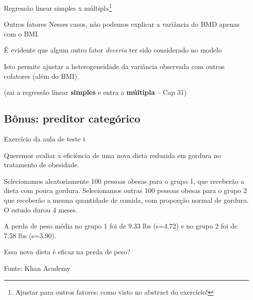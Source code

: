 \documentclass{beamer}
\begin{document}
\begin{frame}{\scriptsize Regressão linear simples x múltipla\footnote{Ajustar para outros fatores: como visto no abstract do exercício!}}
  \begin{block}{Outros fatores}
    \footnotesize
    Nesses casos, não podemos explicar a variância do BMD apenas com o BMI.

    \bigskip
    É evidente que algum outro fator {\em deveria} ter sido considerado no modelo

    \bigskip
    Isto permite \alert{ajustar} a heterogeneidade da variância observada com outros cofatores (além do BMI).
  \end{block}
  \vfill
  \hfill \footnotesize (sai a regressão linear {\bf simples} e entra a {\bf múltipla} -- Cap 31)
\end{frame}

\subsection{Bônus: preditor categórico}

\begin{frame}{\scriptsize Exercício da aula de teste t}
  \begin{exampleblock}{}
    \small
    Queremos avaliar a eficiência de uma nova dieta reduzida em
    gordura no tratamento de obesidade.

    \bigskip
    {\footnotesize
      Selecionamos aleatoriamente 100 pessoas obesas para o grupo 1, que receberão a dieta com pouca gordura.
      Selecionamos outras 100 pessoas obesas para o grupo 2 que receberão a mesma quantidade de comida, com proporção normal de gordura.
      O estudo durou 4 meses.
    }

    \bigskip
    \begin{exampleblock}{}
      \footnotesize
      A perda de peso média no grupo 1 foi de 9.33 lbs
      (s=4.72) e no grupo 2 foi de 7.58 lbs (s=3.90).
    \end{exampleblock}
  \end{exampleblock}
  \begin{block}{}
    \footnotesize
    Essa nova dieta é eficaz na perda de peso?
  \end{block}
  \hfill {\footnotesize Fonte: Khan Academy}
\end{frame}
\end{document}
